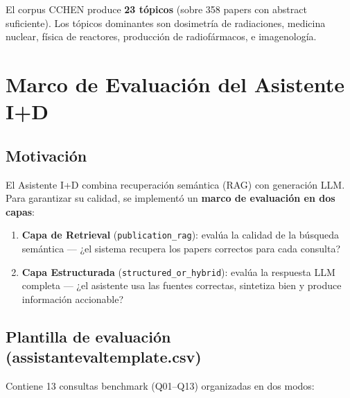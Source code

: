 \documentclass[12pt,a4paper]{report}
\newcommand{\filebreak}{\char95\allowbreak}
\newcommand{\file}[1]{{\color{cchenblue}\ttfamily\let\_\filebreak #1}}
\begin{document}
El corpus CCHEN produce \textbf{23 tópicos} (sobre 358 papers con abstract suficiente). Los tópicos dominantes son dosimetría de radiaciones, medicina nuclear, física de reactores, producción de radiofármacos, e imagenología.

\chapter{Marco de Evaluación del Asistente I+D}

\section{Motivación}

El Asistente I+D combina recuperación semántica (RAG) con generación LLM. Para garantizar su calidad, se implementó un \textbf{marco de evaluación en dos capas}:

\begin{enumerate}
  \item \textbf{Capa de Retrieval} (\texttt{publication\_rag}): evalúa la calidad de la búsqueda semántica --- ¿el sistema recupera los papers correctos para cada consulta?
  \item \textbf{Capa Estructurada} (\texttt{structured\_or\_hybrid}): evalúa la respuesta LLM completa --- ¿el asistente usa las fuentes correctas, sintetiza bien y produce información accionable?
\end{enumerate}

\section[Plantilla de evaluación del asistente]{Plantilla de evaluación (\file{assistant\_eval\_template.csv})}

Contiene 13 consultas benchmark (Q01--Q13) organizadas en dos modos:
\end{document}

